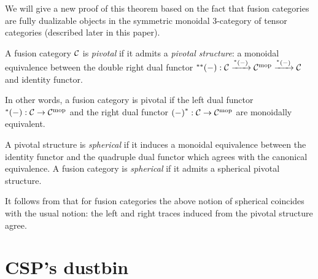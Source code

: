\documentclass{amsart}
\begin{document}
We will give a new proof of this theorem based on the fact that fusion categories are fully dualizable objects in the symmetric monoidal 3-category of tensor categories (described later in this paper).

\begin{definition}
A fusion category $\mathcal C$ is \emph{pivotal} if it admits a {\em pivotal structure}: a monoidal equivalence between the double right dual functor ${}^{**}{(-)}: \mathcal C \xrightarrow{{}^*{(-)}} \mathcal C^{\mathrm{mop}} \xrightarrow{{}^*{(-)}} \mathcal C$ and identity functor.
\end{definition}

In other words, a fusion category is pivotal if the left dual functor ${}^*{(-)}: \mathcal C \rightarrow \mathcal C^{\mathrm{mop}}$ and the right dual functor ${(-)}^*: \mathcal C \rightarrow \mathcal C^{\mathrm{mop}}$ are monoidally equivalent.


\begin{definition}
	A pivotal structure is {\em spherical} if it induces a monoidal equivalence between the identity functor and the quadruple dual functor which agrees with the canonical equivalence. A fusion category is {\em spherical} if it admits a spherical pivotal structure.  
\end{definition}

\begin{remark}
	It follows from \cite[Cor. 7.4]{MR2097289} that for fusion categories the above notion of spherical coincides with the usual notion: the left and right traces induced from the pivotal structure agree.
\end{remark}



\section{CSP's dustbin}
\end{document}
